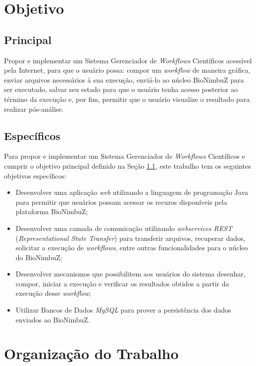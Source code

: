 \section{Objetivo} \label{cap1sec3}

\subsection{Principal} \label{cap1sec3subsec1}

Propor e implementar um Sistema Gerenciador de \textit{Workflows} Científicos acessível pela Internet, para que o usuário possa: compor um \textit{workflow} de maneira gráfica, enviar arquivos necessários à sua execução, enviá-lo ao núcleo BioNimbuZ para ser executado, salvar seu estado para que o usuário tenha acesso posterior ao término da execução e, por fim, permitir que o usuário visualize o resultado para realizar pós-análise.

\subsection{Específicos} \label{cap1sec3subsec2}

Para propor e implementar um Sistema Gerenciador de \textit{Workflows} Científicos e cumprir o objetivo principal definido na Seção \ref{cap1sec3subsec1}, este trabalho tem os seguintes objetivos específicos:

\begin{itemize}
	\item Desenvolver uma aplicação \textit{web} utilizando a linguagem de programação Java para permitir que usuários possam acessar os recuros disponíveis pela plataforma BioNimbuZ;
	\item Desenvolver uma camada de comunicação utilizando \textit{webservices REST} (\textit{Representational State Transfer}) para transferir arquivos, recuperar dados, solicitar a execução de \textit{workflows}, entre outras funcionalidades para o núcleo do BioNimbuZ;
    \item Desenvolver mecanismos que possibilitem aos usuários do sistema desenhar, compor, iniciar a execução e verificar os resultados obtidos a partir da execução desse \textit{workflow};
    \item Utilizar Bancos de Dados \textit{MySQL} para prover a persistência dos dados enviados ao BioNimbuZ.
\end{itemize}

\section{Organização do Trabalho} \label{cap1sec4}

